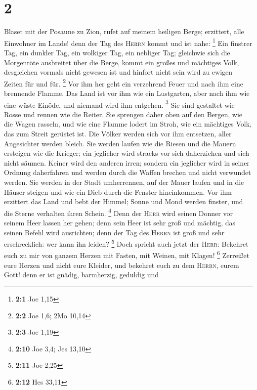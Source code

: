 \hypertarget{section-1}{%
\section{2}\label{section-1}}

 Blaset mit der Posaune zu Zion, rufet auf meinem heiligen
Berge; erzittert, alle Einwohner im Lande! denn der Tag des
\textsc{Herrn} kommt und ist nahe: \footnote{\textbf{2:1} Joe 1,15}
 Ein finstrer Tag, ein dunkler Tag, ein wolkiger Tag, ein
nebliger Tag; gleichwie sich die Morgenröte ausbreitet über die Berge,
kommt ein großes und mächtiges Volk, desgleichen vormals nicht gewesen
ist und hinfort nicht sein wird zu ewigen Zeiten für und für.
\footnote{\textbf{2:2} Joe 1,6; 2Mo 10,14}  Vor ihm her
geht ein verzehrend Feuer und nach ihm eine brennende Flamme. Das Land
ist vor ihm wie ein Lustgarten, aber nach ihm wie eine wüste Einöde, und
niemand wird ihm entgehen. \footnote{\textbf{2:3} Joe 1,19}
 Sie sind gestaltet wie Rosse und rennen wie die Reiter.
 Sie sprengen daher oben auf den Bergen, wie die Wagen
rasseln, und wie eine Flamme lodert im Stroh, wie ein mächtiges Volk,
das zum Streit gerüstet ist.  Die Völker werden sich vor
ihm entsetzen, aller Angesichter werden bleich.  Sie
werden laufen wie die Riesen und die Mauern ersteigen wie die Krieger;
ein jeglicher wird stracks vor sich daherziehen und sich nicht säumen.
 Keiner wird den anderen irren; sondern ein jeglicher wird
in seiner Ordnung daherfahren und werden durch die Waffen brechen und
nicht verwundet werden.  Sie werden in der Stadt
umherrennen, auf der Mauer laufen und in die Häuser steigen und wie ein
Dieb durch die Fenster hineinkommen.  Vor ihm erzittert
das Land und bebt der Himmel; Sonne und Mond werden finster, und die
Sterne verhalten ihren Schein. \footnote{\textbf{2:10} Joe 3,4; Jes
  13,10}  Denn der \textsc{Herr} wird seinen Donner vor
seinem Heer lassen her gehen; denn sein Heer ist sehr groß und mächtig,
das seinen Befehl wird ausrichten; denn der Tag des \textsc{Herrn} ist
groß und sehr erschrecklich: wer kann ihn leiden? \footnote{\textbf{2:11}
  Joe 2,25}  Doch spricht auch jetzt der \textsc{Herr}:
Bekehret euch zu mir von ganzem Herzen mit Fasten, mit Weinen, mit
Klagen! \footnote{\textbf{2:12} Hes 33,11}  Zerreißet
eure Herzen und nicht eure Kleider, und bekehret euch zu dem
\textsc{Herrn}, eurem Gott! denn er ist gnädig, barmherzig, geduldig und
